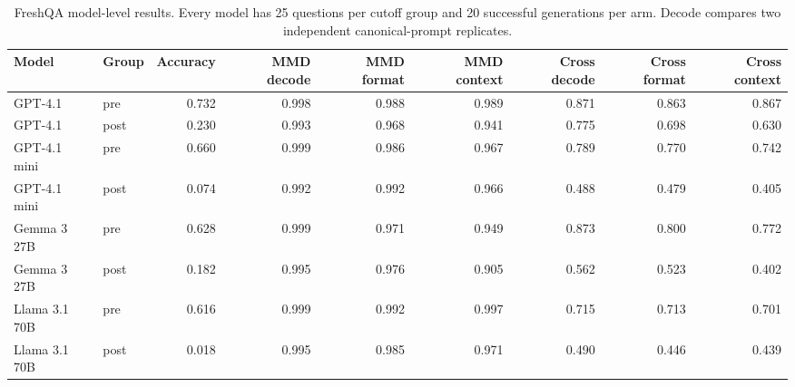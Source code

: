 \begin{table}[t]
\centering\scriptsize\revisioncolor
\setlength{\tabcolsep}{3pt}
\begin{tabular}{llrrrrrrr}
\toprule
Model & Group & Accuracy & MMD decode & MMD format & MMD context & Cross decode & Cross format & Cross context \\
\midrule
GPT-4.1 & pre & 0.732 & 0.998 & 0.988 & 0.989 & 0.871 & 0.863 & 0.867 \\
GPT-4.1 & post & 0.230 & 0.993 & 0.968 & 0.941 & 0.775 & 0.698 & 0.630 \\
GPT-4.1 mini & pre & 0.660 & 0.999 & 0.986 & 0.967 & 0.789 & 0.770 & 0.742 \\
GPT-4.1 mini & post & 0.074 & 0.992 & 0.992 & 0.966 & 0.488 & 0.479 & 0.405 \\
Gemma 3 27B & pre & 0.628 & 0.999 & 0.971 & 0.949 & 0.873 & 0.800 & 0.772 \\
Gemma 3 27B & post & 0.182 & 0.995 & 0.976 & 0.905 & 0.562 & 0.523 & 0.402 \\
Llama 3.1 70B & pre & 0.616 & 0.999 & 0.992 & 0.997 & 0.715 & 0.713 & 0.701 \\
Llama 3.1 70B & post & 0.018 & 0.995 & 0.985 & 0.971 & 0.490 & 0.446 & 0.439 \\
\bottomrule
\end{tabular}
\caption{FreshQA model-level results. Every model has 25 questions per cutoff group and 20 successful generations per arm. Decode compares two independent canonical-prompt replicates.}
\label{tab:freshqa_models}
\end{table}
